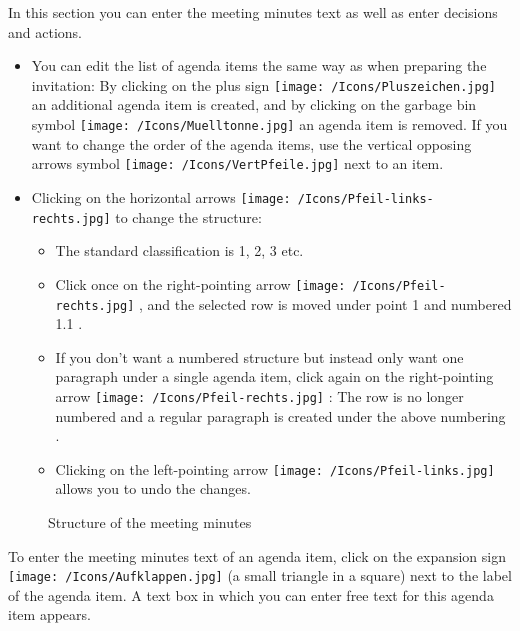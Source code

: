 In this section you can enter the meeting minutes text as well as enter decisions and actions.

\begin{itemize}
\item
You can edit the list of agenda items the same way as when preparing the invitation: By clicking on the plus sign \texttt{[image: /Icons/Pluszeichen.jpg]}  an additional agenda item is created, and by clicking on the garbage bin symbol \texttt{[image: /Icons/Muelltonne.jpg]}  an agenda item is removed. If you want to change the order of the agenda items, use the vertical opposing arrows symbol \texttt{[image: /Icons/VertPfeile.jpg]}  next to an item.
\item
Clicking on the horizontal arrows \texttt{[image: /Icons/Pfeil-links-rechts.jpg]}  to change the structure:

	\begin{itemize}
		\item
		The standard classification is 1, 2, 3 etc. 
		\item
		Click once on the right-pointing arrow \texttt{[image: /Icons/Pfeil-rechts.jpg]} , and the selected row is moved under point 1 and numbered 1.1 .
		\item
		If you don't want a numbered structure but instead only want one paragraph under a single agenda item, click again on the right-pointing arrow \texttt{[image: /Icons/Pfeil-rechts.jpg]} : The row is no longer numbered and a regular paragraph is created under the above numbering .
		\item
		Clicking on the left-pointing arrow \texttt{[image: /Icons/Pfeil-links.jpg]}  allows you to undo the changes.
	\end{itemize}
\end{itemize}

\begin{figure}[H]
\caption{Structure of the meeting minutes}
\end{figure}

To enter the meeting minutes text of an agenda item, click on the expansion sign \texttt{[image: /Icons/Aufklappen.jpg]}  (a small triangle in a square) next to the label of the agenda item. A text box in which you can enter free text for this agenda item  appears.

\vspace{\baselineskip}

